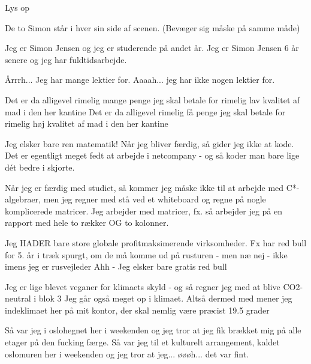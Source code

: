 \documentclass[a4paper,11pt]{article}
\begin{document}
\begin{sketch}

\scene Lys op

\scene De to Simon står i hver sin side af scenen. (Bevæger sig måske på samme måde)

Jeg er Simon Jensen og jeg er studerende på andet år.
Jeg er Simon Jensen 6 år senere og jeg har fuldtidsarbejde.

Årrrh... Jeg har mange lektier for.
Aaaah... jeg har ikke nogen lektier for.

Det er da alligevel rimelig mange penge jeg skal betale for rimelig lav kvalitet af mad i den her kantine
Det er da alligevel rimelig få penge jeg skal betale for rimelig høj kvalitet af mad i den her kantine

Jeg elsker bare ren matematik! Når jeg bliver færdig, så gider jeg ikke at kode.
Det er egentligt meget fedt at arbejde i netcompany - og så koder man bare lige dét bedre i skjorte.

Når jeg er færdig med studiet, så kommer jeg måske ikke til at arbejde med C*-algebraer, men jeg regner med stå ved et whiteboard og regne på nogle komplicerede matricer.
Jeg arbejder med matricer, fx. så arbejder jeg på en rapport med hele to rækker OG to kolonner.

Jeg HADER bare store globale profitmaksimerende virksomheder. Fx har red bull for 5. år i træk spurgt, om de må komme ud på rusturen - men næ nej - ikke imens jeg er rusvejleder
Ahh - Jeg elsker bare gratis red bull

Jeg er lige blevet veganer for klimaets skyld - og så
regner jeg med at blive CO2-neutral i blok 3
Jeg går også meget op i klimaet. Altså dermed med mener jeg indeklimaet her på mit kontor, der skal nemlig være præcist 19.5 grader




Så var jeg i oslohegnet her i weekenden og jeg tror at jeg fik brækket mig på alle etager på den fucking færge.
Så var jeg til et kulturelt arrangement, kaldet oslomuren her i weekenden og jeg tror at jeg... øøøh... det var fint.


\end{sketch}
\end{document}
